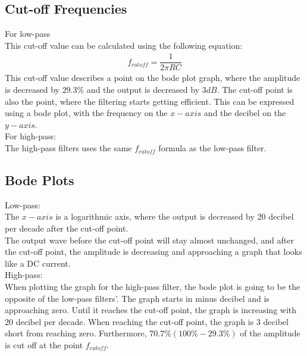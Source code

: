 \subsection{Cut-off Frequencies}
For low-pass \\
This cut-off value can be calculated using the following equation:
\begin{align*}
f_{cutoff}=\dfrac{1}{2 \pi RC}
\end{align*}
This cut-off value describes a point on the bode plot graph, where the amplitude is decreased by $29.3\%$ and the output is decreased by $3dB$. The cut-off point is also the point, where the filtering starts getting efficient. This can be expressed using a bode plot, with the frequency on the $x-axis$ and the decibel on the $y-axis$.\\
For high-pass: \\
The high-pass filters uses the same $f_{cutoff}$ formula as the low-pass filter.

\subsection{Bode Plots}
Low-pass: \\
The $x-axis$ is a logarithmic axis, where the output is decreased by 20 decibel per decade after the cut-off point. \\
The output wave before the cut-off point will stay almost unchanged, and after the cut-off point, the amplitude is decreasing and approaching a graph that looks like a DC current. \\
High-pass: \\
When plotting the graph for the high-pass filter, the bode plot is going to be the opposite of the low-pass filters'. The graph starts in minus decibel and is approaching zero. Until it reaches the cut-off point, the graph is increasing with 20 decibel per decade. When reaching the cut-off point, the graph is 3 decibel short from reaching zero. Furthermore, $70.7\% (100\%-29.3\%)$ of the amplitude is cut off at the point $f_{cutoff}$.
